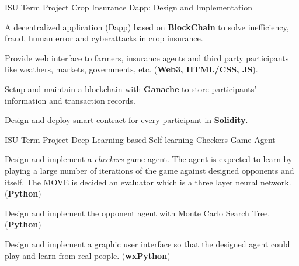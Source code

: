




\begin{cventries}
  \cventry
    {ISU Term Project} %
    {Crop Insurance Dapp: Design and Implementation} %
    {} %
    {} %
    {
      \begin{cvitems} %
        \item {A decentralized application (Dapp) based on \textbf{BlockChain} to solve inefficiency, fraud, human error and cyberattacks in crop insurance. }
        \item {Provide web interface to farmers, insurance agents and third party participants like weathers, markets, governments, etc. (\textbf{Web3, HTML/CSS, JS}). }
        \item {Setup and maintain a blockchain with \textbf{Ganache} to store participants' information and transaction records. }
        \item {Design and deploy smart contract for every participant in \textbf{Solidity}. }
      \end{cvitems}
    }

  \cventry
    {ISU Term Project} %
    {Deep Learning-based Self-learning Checkers Game Agent} %
    {} %
    {} %
    {
      \begin{cvitems} %
      	\item {Design and implement a \textit{checkers} game agent. The agent is expected to learn by playing a large number of iterations of the game against designed opponents and itself. The MOVE is decided an evaluator which is a three layer neural network. (\textbf{Python})}
        \item {Design and implement the opponent agent with Monte Carlo Search Tree. (\textbf{Python})}
        \item {Design and implement a graphic user interface so that the designed agent could play and learn from real people. (\textbf{wxPython})}
      \end{cvitems}
    }


\end{cventries}
